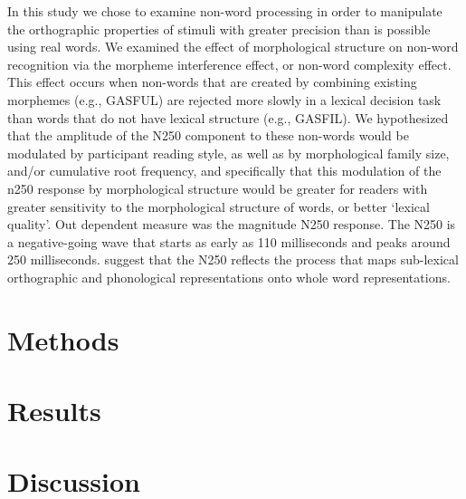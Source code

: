 \documentclass[review]{elsarticle}
\begin{document}
In this study we chose to examine  non-word processing in order to manipulate the orthographic properties of stimuli with greater precision than is possible using real words.  We examined the effect of morphological structure on non-word recognition via the morpheme interference effect, or non-word complexity effect.  This effect occurs when non-words that are created by combining existing morphemes (e.g., GASFUL) are rejected more slowly in a lexical decision task than words that do not have lexical structure (e.g., GASFIL).  We hypothesized that the amplitude of the N250 component to  these non-words would be modulated by participant reading style, as well as by morphological family size, and/or cumulative root frequency, and specifically that  this modulation of the n250 response by morphological structure would be greater for readers with greater sensitivity to the morphological structure of words, or better `lexical quality'.  Out dependent measure was the magnitude N250 response.  The N250 is a negative-going wave that starts as early as 110 milliseconds and peaks around 250 milliseconds. {\renewcommand\&{and}\citet{holcombTimeCourseVisual2006}}  suggest that the N250 reflects the process that maps sub-lexical orthographic and phonological representations onto whole word representations.

\section{Methods}


\section{Results}



\section{Discussion}
	



\end{document}
